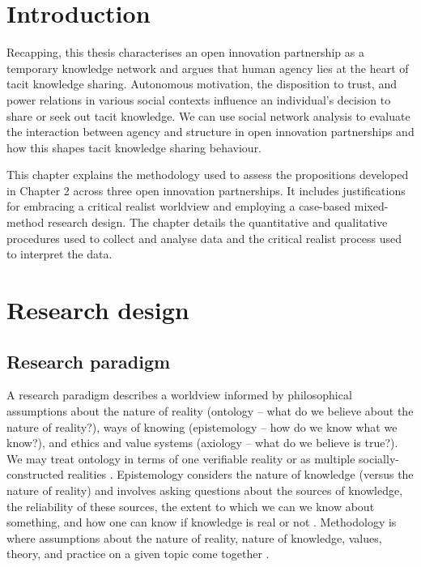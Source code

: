 \section{Introduction}

Recapping, this thesis characterises an open innovation partnership as a temporary knowledge network and argues that human agency lies at the heart of tacit knowledge sharing. Autonomous motivation, the disposition to trust, and power relations in various social contexts influence an individual's decision to share or seek out tacit knowledge. We can use social network analysis to evaluate the interaction between agency and structure in open innovation partnerships and how this shapes tacit knowledge sharing behaviour. \medskip

This chapter explains the methodology used to assess the propositions developed in Chapter 2 across three open innovation partnerships. It includes justifications for embracing a critical realist worldview and employing a case-based mixed-method research design. The chapter details the quantitative and qualitative procedures used to collect and analyse data and the critical realist process used to interpret the data. 

\section{Research design}

\subsection{Research paradigm}

A research paradigm describes a worldview informed by philosophical assumptions about the nature of reality (ontology -- what do we believe about the nature of reality?), ways of knowing (epistemology -- how do we know what we know?), and ethics and value systems (axiology -- what do we believe is true?). We may treat ontology in terms of one verifiable reality or as multiple socially-constructed realities \citep{chilisa2012selecting}. Epistemology considers the nature of knowledge (versus the nature of reality) and involves asking questions about the sources of knowledge, the reliability of these sources, the extent to which we can we know about something, and how one can know if knowledge is real or not \citep{patton2002qualitative}. Methodology is where assumptions about the nature of reality, nature of knowledge, values, theory, and practice on a given topic come together \citep{chilisa2012selecting}.

